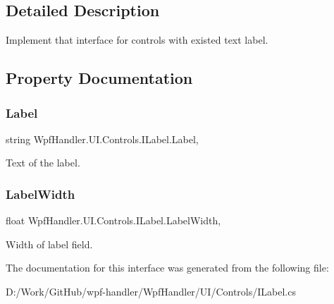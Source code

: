 \subsection{Detailed Description}
Implement that interface for controls with existed text label. 



\subsection{Property Documentation}
\mbox{\label{interface_wpf_handler_1_1_u_i_1_1_controls_1_1_i_label_aebbb23ec8dfeb78718107bc877f39c98}} 
\subsubsection{\texorpdfstring{Label}{Label}}
{\footnotesize\ttfamily string Wpf\+Handler.\+U\+I.\+Controls.\+I\+Label.\+Label\hspace{0.3cm}{\ttfamily [get]}, {\ttfamily [set]}}



Text of the label. 

\mbox{\label{interface_wpf_handler_1_1_u_i_1_1_controls_1_1_i_label_a20f588e0463f8b77531f342415f2eaa4}} 
\subsubsection{\texorpdfstring{Label\+Width}{LabelWidth}}
{\footnotesize\ttfamily float Wpf\+Handler.\+U\+I.\+Controls.\+I\+Label.\+Label\+Width\hspace{0.3cm}{\ttfamily [get]}, {\ttfamily [set]}}



Width of label field. 



The documentation for this interface was generated from the following file\+:\begin{DoxyCompactItemize}
\item 
D\+:/\+Work/\+Git\+Hub/wpf-\/handler/\+Wpf\+Handler/\+U\+I/\+Controls/I\+Label.\+cs\end{DoxyCompactItemize}
